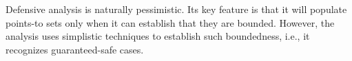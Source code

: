 






Defensive analysis is naturally pessimistic. Its key feature is that
it will populate points-to sets only when it can establish that they
are bounded. However, the analysis uses simplistic techniques to
establish such boundedness, i.e., it recognizes guaranteed-safe cases.

